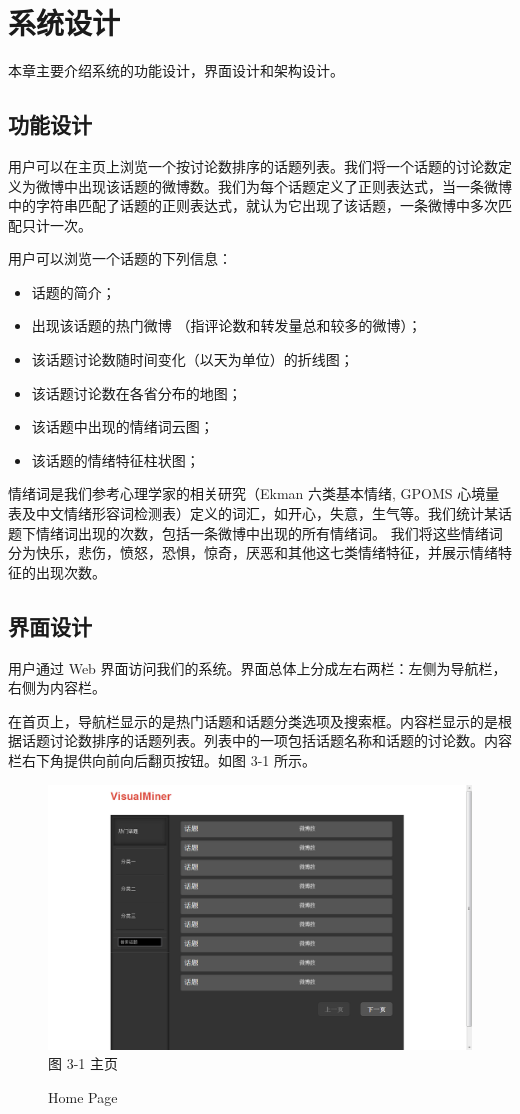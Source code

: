 \chapter{系统设计}
\thispagestyle{fancy}
本章主要介绍系统的功能设计，界面设计和架构设计。

\section{功能设计}
用户可以在主页上浏览一个按讨论数排序的话题列表。我们将一个话题的讨论数定义为微博中出现该话题的微博数。我们为每个话题定义了正则表达式，当一条微博中的字符串匹配了话题的正则表达式，就认为它出现了该话题，一条微博中多次匹配只计一次。

用户可以浏览一个话题的下列信息：
\begin{itemize}
\item 话题的简介；
\item 出现该话题的热门微博 （指评论数和转发量总和较多的微博）；
\item 该话题讨论数随时间变化（以天为单位）的折线图；
\item 该话题讨论数在各省分布的地图；
\item 该话题中出现的情绪词云图；
\item 该话题的情绪特征柱状图；
\end{itemize}

情绪词是我们参考心理学家的相关研究（Ekman 六类基本情绪\cite{ekman71}, GPOMS 心境量表\cite{gpoms11}及中文情绪形容词检测表\cite{zj05}）定义的词汇，如开心，失意，生气等。我们统计某话题下情绪词出现的次数，包括一条微博中出现的所有情绪词。
我们将这些情绪词分为快乐，悲伤，愤怒，恐惧，惊奇，厌恶和其他这七类情绪特征，并展示情绪特征的出现次数。

\section{界面设计}
用户通过 Web 界面访问我们的系统。界面总体上分成左右两栏：左侧为导航栏，右侧为内容栏。

在首页上，导航栏显示的是热门话题和话题分类选项及搜索框。内容栏显示的是根据话题讨论数排序的话题列表。列表中的一项包括话题名称和话题的讨论数。内容栏右下角提供向前向后翻页按钮。如图 3-1 所示。

\begin{figure}[!h]
\centering
\includegraphics[width=\textwidth, height=0.4\textheight]{web_main}
图 3-1 主页
\caption{Home Page}
\end{figure}

